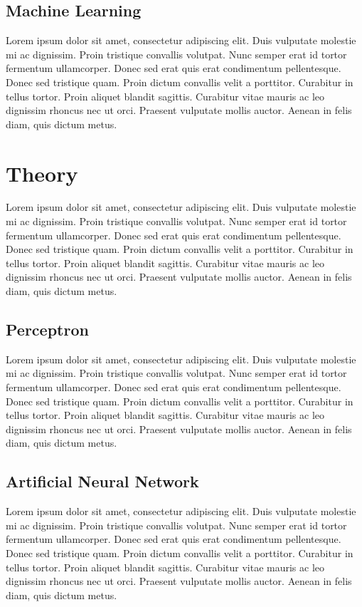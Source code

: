 \documentclass[11pt]{article}
\begin{document}
\subsection{Machine Learning}
Lorem ipsum dolor sit amet, consectetur adipiscing elit. Duis vulputate molestie mi ac dignissim. Proin tristique convallis volutpat. Nunc semper erat id tortor fermentum ullamcorper. Donec sed erat quis erat condimentum pellentesque. Donec sed tristique quam. Proin dictum convallis velit a porttitor. Curabitur in tellus tortor. Proin aliquet blandit sagittis. Curabitur vitae mauris ac leo dignissim rhoncus nec ut orci. Praesent vulputate mollis auctor. Aenean in felis diam, quis dictum metus.

\section{Theory}
Lorem ipsum dolor sit amet, consectetur adipiscing elit. Duis vulputate molestie mi ac dignissim. Proin tristique convallis volutpat. Nunc semper erat id tortor fermentum ullamcorper. Donec sed erat quis erat condimentum pellentesque. Donec sed tristique quam. Proin dictum convallis velit a porttitor. Curabitur in tellus tortor. Proin aliquet blandit sagittis. Curabitur vitae mauris ac leo dignissim rhoncus nec ut orci. Praesent vulputate mollis auctor. Aenean in felis diam, quis dictum metus.

\subsection{Perceptron}
Lorem ipsum dolor sit amet, consectetur adipiscing elit. Duis vulputate molestie mi ac dignissim. Proin tristique convallis volutpat. Nunc semper erat id tortor fermentum ullamcorper. Donec sed erat quis erat condimentum pellentesque. Donec sed tristique quam. Proin dictum convallis velit a porttitor. Curabitur in tellus tortor. Proin aliquet blandit sagittis. Curabitur vitae mauris ac leo dignissim rhoncus nec ut orci. Praesent vulputate mollis auctor. Aenean in felis diam, quis dictum metus.

\subsection{Artificial Neural Network}
Lorem ipsum dolor sit amet, consectetur adipiscing elit. Duis vulputate molestie mi ac dignissim. Proin tristique convallis volutpat. Nunc semper erat id tortor fermentum ullamcorper. Donec sed erat quis erat condimentum pellentesque. Donec sed tristique quam. Proin dictum convallis velit a porttitor. Curabitur in tellus tortor. Proin aliquet blandit sagittis. Curabitur vitae mauris ac leo dignissim rhoncus nec ut orci. Praesent vulputate mollis auctor. Aenean in felis diam, quis dictum metus.
\end{document}
